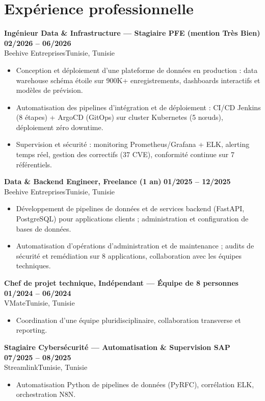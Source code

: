 \documentclass[a4paper,9pt]{article}
\newcommand{\cventry}[4]{\textbf{#1} \hfill \textbf{#4}\\[0.2pt]#2{\ifx\relax#3\relax\else, #3\fi}\par\vspace{0.3pt}}
\begin{document}
\section{Expérience professionnelle}
\cventry{Ingénieur Data \& Infrastructure --- Stagiaire PFE (mention Très Bien)}{Beehive Entreprises}{Tunisie}{02/2026 -- 06/2026}
\begin{itemize}
  \item Conception et déploiement d'une plateforme de données en production : data warehouse schéma étoile sur 900K+ enregistrements, dashboards interactifs et modèles de prévision.
  \item Automatisation des pipelines d'intégration et de déploiement : CI/CD Jenkins (8 étapes) + ArgoCD (GitOps) sur cluster Kubernetes (5 nœuds), déploiement zéro downtime.
  \item Supervision et sécurité : monitoring Prometheus/Grafana + ELK, alerting temps réel, gestion des correctifs (37 CVE), conformité continue sur 7 référentiels.
\end{itemize}
\cventry{Data \& Backend Engineer, Freelance (1 an)}{Beehive Entreprises}{Tunisie}{01/2025 -- 12/2025}
\begin{itemize}
  \item Développement de pipelines de données et de services backend (FastAPI, PostgreSQL) pour applications clients ; administration et configuration de bases de données.
  \item Automatisation d'opérations d'administration et de maintenance ; audits de sécurité et remédiation sur 8 applications, collaboration avec les équipes techniques.
\end{itemize}
\cventry{Chef de projet technique, Indépendant --- Équipe de 8 personnes}{VMate}{Tunisie}{01/2024 -- 06/2024}
\begin{itemize}
  \item Coordination d'une équipe pluridisciplinaire, collaboration transverse et reporting.
\end{itemize}
\cventry{Stagiaire Cybersécurité --- Automatisation \& Supervision SAP}{Streamlink}{Tunisie}{07/2025 -- 08/2025}
\begin{itemize}
  \item Automatisation Python de pipelines de données (PyRFC), corrélation ELK, orchestration N8N.
\end{itemize}
\end{document}
